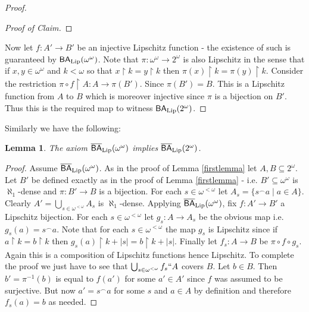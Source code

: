 \documentclass[leqno,11pt]{amsart}
\newtheorem{lemma}[theorem]{Lemma}
\theoremstyle{definition}
\theoremstyle{remark}
\def\hook{\upharpoonright}
\def\BA{\mathsf{BA}}
\def\baire{\omega^\omega}
\def\cantor{2^\omega}
\begin{document}
\begin{proof}
\begin{proof}[Proof of Claim]
        
    \end{proof}

    Now let $f:A' \to B'$ be an injective Lipschitz function - the existence of such is guaranteed by $\BA_{\rm Lip}(\baire)$. Note that $\pi:\baire \to \cantor$ is also Lipschitz in the sense that if $x, y \in \baire$ and $k < \omega$ so that $x \hook k = y \hook k$ then $\pi (x) \hook k = \pi (y) \hook k$. Consider the restriction $\pi \circ f \hook A: A \to \pi (B')$. Since $\pi (B') = B$. This is a Lipschitz function from $A$ to $B$ which is moreover injective since $\pi$ is a bijection on $B'$. Thus this is the required map to witness $\BA_{\rm Lip}(2^\omega)$. 
\end{proof}

Similarly we have the following:
\begin{lemma}
    The axiom $\overline{\BA}_{\rm Lip}(\baire)$ implies $\overline{\BA}_{\rm Lip}(\cantor)$.
\end{lemma}

\begin{proof}
    Assume $\overline{\BA}_{\rm Lip}(\baire)$. As in the proof of Lemma \ref{firstlemma} let $A, B \subseteq 2^\omega$. Let $B'$ be defined exactly as in the proof of Lemma \ref{firstlemma} - i.e. $B' \subseteq \baire$ is $\aleph_1$-dense and $\pi:B' \to B$ is a bijection. For each $s \in {\omega}^{<\omega}$ let $A_s = \{s^\frown a\; | \; a \in A\}$. Clearly $A' = \bigcup_{s \in \omega^{<\omega}} A_s$ is $\aleph_1$-dense. Applying $\overline{\BA}_{\rm Lip}(\baire)$, fix $f:A' \to B'$ a Lipschitz bijection. For each $s \in \omega^{<\omega}$ let $g_s:A \to A_s$ be the obvious map i.e. $g_s (a) = s^\frown a$. Note that for each $s \in \omega^{<\omega}$ the map $g_s$ is Lipschitz since if $a \hook k = b \hook k$ then $g_s (a) \hook k + |s| = b \hook k + |s|$. Finally let $f_s:A \to B$ be $\pi \circ f \circ g_s$. Again this is a composition of Lipschitz functions hence Lipschitz. To complete the proof we just have to see that $\bigcup_{s \in \omega^{<\omega}} f_s``A$ covers $B$. Let $b \in B$. Then $b' = \pi^{-1}(b)$ is equal to $f(a')$ for some $a' \in A'$ since $f$ was assumed to be surjective. But now $a' = s^\frown a$ for some $s$ and $a \in A$ by definition and therefore $f_s (a) = b$ as needed. 
\end{proof}
\end{document}
